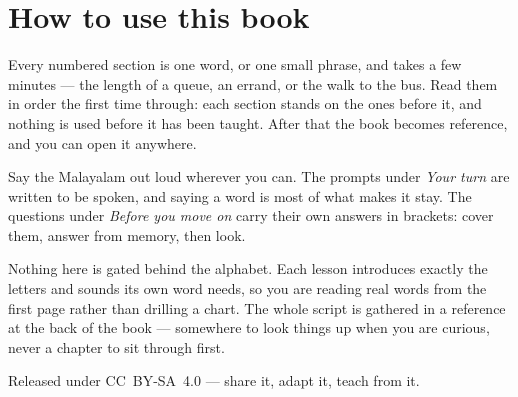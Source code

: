 \documentclass[11pt,twoside]{book}
\begin{document}
\section*{How to use this book}

Every numbered section is one word, or one small phrase, and takes a few
minutes --- the length of a queue, an errand, or the walk to the bus. Read them
in order the first time through: each section stands on the ones before it, and
nothing is used before it has been taught. After that the book becomes
reference, and you can open it anywhere.

Say the Malayalam out loud wherever you can. The prompts under \emph{Your turn}
are written to be spoken, and saying a word is most of what makes it stay. The
questions under \emph{Before you move on} carry their own answers in brackets:
cover them, answer from memory, then look.

Nothing here is gated behind the alphabet. Each lesson introduces exactly the
letters and sounds its own word needs, so you are reading real words from the
first page rather than drilling a chart. The whole script is gathered in a
reference at the back of the book --- somewhere to look things up when you are
curious, never a chapter to sit through first.

Released under CC~BY-SA~4.0 --- share it, adapt it, teach from it.

\tableofcontents

\mainmatter


\end{document}
